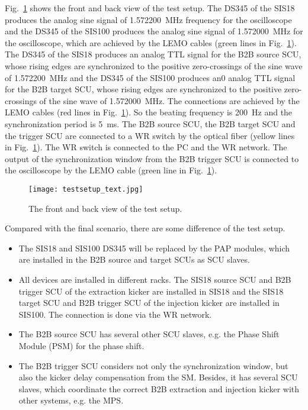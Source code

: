 Fig.~\ref{testsetup_text} shows the front and back view of the test setup. The DS345 of the SIS18 produces the analog sine signal of \SI{1.572200}{\MHz} frequency for the oscilloscope and the DS345 of the SIS100 produces the analog sine signal of \SI{1.572000}{\MHz} for the oscilloscope, which are achieved by the LEMO cables (green lines in Fig.~\ref{testsetup_text}). The DS345 of the SIS18 produces an analog TTL signal for the B2B source SCU, whose rising edges are synchronized to the positive zero-crossings of the sine wave of \SI{1.572200}{\MHz} and the DS345 of the SIS100 produces an0 analog TTL signal for the B2B target SCU, whose rising edges are synchronized to the positive zero-crossings of the sine wave of \SI{1.572000}{\MHz}. The connections are achieved by the LEMO cables (red lines in Fig.~\ref{testsetup_text}). So the beating frequency is \SI{200}{\Hz} and the synchronization period is \SI{5}{\ms}. The B2B source SCU, the B2B target SCU and the trigger SCU are connected to a WR switch by the optical fiber (yellow lines in Fig.~\ref{testsetup_text}). The WR switch is connected to the PC and the WR network. The output of the synchronization window from the B2B trigger SCU is connected to the oscilloscope by the LEMO cable (green line in Fig.~\ref{testsetup_text}). 

\begin{figure}[!htb]
   \centering   
   \texttt{[image: testsetup\_text.jpg]}
   \caption{The front and back view of the test setup.}
   \label{testsetup_text}
\end{figure}

Compared with the final scenario, there are some difference of the test setup.
\begin{itemize}
\item
The SIS18 and SIS100 DS345 will be replaced by the PAP modules, which are installed in the B2B source and target SCUs as SCU slaves. 
\item 
All devices are installed in different racks. The SIS18 source SCU and B2B trigger SCU of the extraction kicker are installed in SIS18 and the SIS18 target SCU and B2B trigger SCU of the injection kicker are installed in SIS100. The connection is done via the WR network. 
\item 
The B2B source SCU has several other SCU slaves, e.g. the Phase Shift Module (PSM) for the phase shift. 
\item 
The B2B trigger SCU considers not only the synchronization window, but also the kicker delay compensation from the SM. Besides, it has several SCU slaves, which coordinate the correct B2B extraction and injection kicker with other systems, e.g. the MPS.
\end{itemize}


